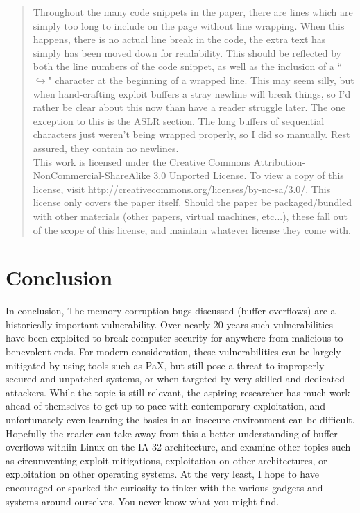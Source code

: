\documentclass[a4paper]{article}
\begin{document}
\begin{abstract}
Throughout the many code snippets in the paper, there are lines which are simply too long
to include on the page without line wrapping. When this happens, there is no actual line break
in the code, the extra text has simply has been moved down for readability. This should
be reflected by both the line numbers of the code snippet, as well as the inclusion
of a ``$\hookrightarrow$" character at the beginning of a wrapped line. This may seem silly,
but when hand-crafting exploit buffers a stray newline will break things, so I'd rather
be clear about this now than have a reader struggle later. The one exception to this is the
ASLR section. The long buffers of sequential characters just weren't being wrapped properly,
so I did so manually. Rest assured, they contain no newlines.\\

This work is licensed under the Creative Commons Attribution-NonCommercial-ShareAlike 3.0 Unported License.
To view a copy of this license, visit http://creativecommons.org/licenses/by-nc-sa/3.0/. This
license only covers the paper itself. Should the paper be packaged/bundled with other
materials (other papers, virtual machines, etc...), these fall out of the scope of this license,
and maintain whatever license they come with.

\end{abstract}





\section{Conclusion}
In conclusion, The memory corruption bugs discussed (buffer overflows)
are a historically important vulnerability. Over nearly 20 years such
vulnerabilities have been exploited to break computer security for anywhere
from malicious to benevolent ends. For modern consideration, these vulnerabilities
can be largely mitigated by using tools such as PaX, but still pose a threat
to improperly secured and unpatched systems, or when targeted by very
skilled and dedicated attackers. While the topic is still relevant, the
aspiring researcher has much work ahead of themselves to get up to pace
with contemporary exploitation, and unfortunately even learning the basics
in an insecure environment can be difficult.
Hopefully the reader can take away from this a better understanding of buffer
overflows withiin Linux on the IA-32 architecture, and examine other topics
such as circumventing exploit mitigations, exploitation on other architectures,
or exploitation on other operating systems. At the very least, I hope to have
encouraged or sparked the curiosity to tinker with the various gadgets and systems
around ourselves. You never know what you might find.
\end{document}

